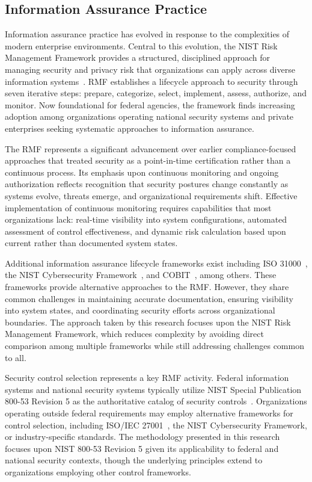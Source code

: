 \subsection{Information Assurance Practice}

Information assurance practice has evolved in response to the complexities of modern enterprise environments. Central to this evolution, the NIST Risk Management Framework provides a structured, disciplined approach for managing security and privacy risk that organizations can apply across diverse information systems~\parencite{Force_2020}. RMF establishes a lifecycle approach to security through seven iterative steps: prepare, categorize, select, implement, assess, authorize, and monitor. Now foundational for federal agencies, the framework finds increasing adoption among organizations operating national security systems and private enterprises seeking systematic approaches to information assurance.

The RMF represents a significant advancement over earlier compliance-focused approaches that treated security as a point-in-time certification rather than a continuous process. Its emphasis upon continuous monitoring and ongoing authorization reflects recognition that security postures change constantly as systems evolve, threats emerge, and organizational requirements shift. Effective implementation of continuous monitoring requires capabilities that most organizations lack: real-time visibility into system configurations, automated assessment of control effectiveness, and dynamic risk calculation based upon current rather than documented system states.

Additional information assurance lifecycle frameworks exist including ISO 31000~\parencite{for_2018}, the NIST Cybersecurity Framework~\parencite{Cybersecurity_Framework_2013}, and COBIT~\parencite{ISACA2019COBIT}, among others. These frameworks provide alternative approaches to the RMF\@. However, they share common challenges in maintaining accurate documentation, ensuring visibility into system states, and coordinating security efforts across organizational boundaries. The approach taken by this research focuses upon the NIST Risk Management Framework, which reduces complexity by avoiding direct comparison among multiple frameworks while still addressing challenges common to all.

Security control selection represents a key RMF activity. Federal information systems and national security systems typically utilize NIST Special Publication 800-53 Revision 5 as the authoritative catalog of security controls~\parencite{Force_2020}. Organizations operating outside federal requirements may employ alternative frameworks for control selection, including ISO/IEC 27001~\parencite{ISO27001-2023}, the NIST Cybersecurity Framework, or industry-specific standards. The methodology presented in this research focuses upon NIST 800-53 Revision 5 given its applicability to federal and national security contexts, though the underlying principles extend to organizations employing other control frameworks.

